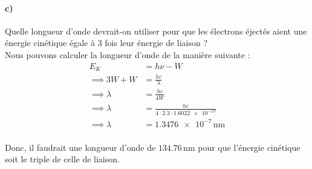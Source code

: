 \documentclass[11pt, letterpaper]{article}
\begin{document}
\newpage

\paragraph*{c)}
Quelle longueur d’onde devrait-on utiliser pour que les électrons éjectés aient une énergie
cinétique égale à $3$ fois leur énergie de liaison ?\\

Nous pouvons calculer la longueur d'onde de la manière suivante :\\
\begin{align*}
    E_K & = h\nu - W
    \\ \implies 3 W + W & = \frac{hc}{\lambda}
    \\ \implies \lambda & = \frac{hc}{4W}
    \\ \implies \lambda & = \frac{hc}{4 \cdot 2.3 \cdot \num{1.6022e-19}}
    \\ \implies \lambda &= \num{1.3476e-7} \,\text{nm}\\
\end{align*}

\begin{tcolorbox}[tommy]
    Donc, il faudrait une longueur d'onde de $134.76\,$nm pour que l'énergie cinétique soit le triple de celle de liaison.
\end{tcolorbox}
\end{document}
